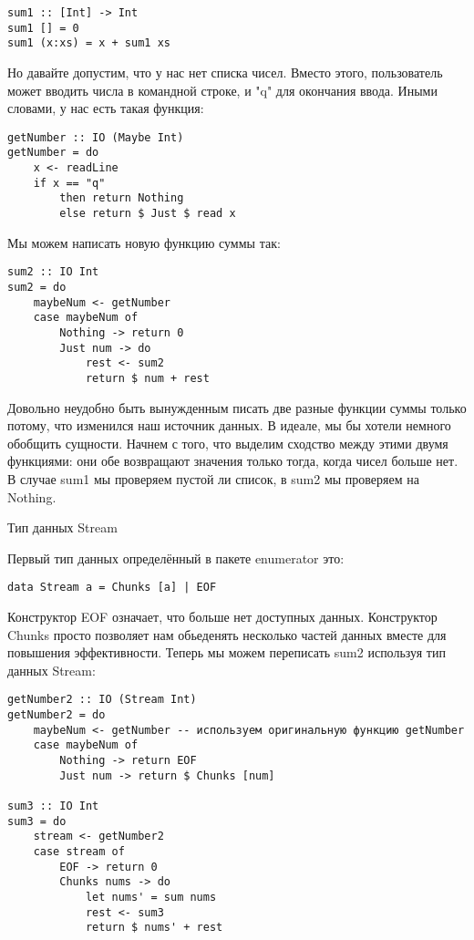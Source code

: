 \begin{lstlisting}
sum1 :: [Int] -> Int
sum1 [] = 0
sum1 (x:xs) = x + sum1 xs
\end{lstlisting}

Но давайте допустим, что у нас нет списка чисел. Вместо этого, пользователь может вводить числа в командной строке, и "q" для окончания ввода. Иными словами, у нас есть такая функция:

\begin{lstlisting}
getNumber :: IO (Maybe Int)
getNumber = do
    x <- readLine
    if x == "q"
        then return Nothing
        else return $ Just $ read x
\end{lstlisting}

Мы можем написать новую функцию суммы так:

\begin{lstlisting}
sum2 :: IO Int
sum2 = do
    maybeNum <- getNumber
    case maybeNum of
        Nothing -> return 0
        Just num -> do
            rest <- sum2
            return $ num + rest
\end{lstlisting}

Довольно неудобно быть вынужденным писать две разные функции суммы только потому, что изменился наш источник данных. В идеале, мы бы хотели немного обобщить сущности. Начнем с того, что выделим сходство между этими двумя функциями: они обе возвращают значения только тогда, когда чисел больше нет. В случае sum1 мы проверяем пустой ли список, в sum2 мы проверяем на Nothing.

Тип данных Stream

Первый тип данных определённый в пакете enumerator это: 

\begin{lstlisting}
data Stream a = Chunks [a] | EOF
\end{lstlisting}

Конструктор EOF означает, что больше нет доступных данных. Конструктор Chunks просто позволяет нам обьеденять несколько частей данных вместе для повышения эффективности. Теперь мы можем переписать sum2 используя тип данных Stream:

\begin{lstlisting}
getNumber2 :: IO (Stream Int)
getNumber2 = do
    maybeNum <- getNumber -- используем оригинальную функцию getNumber
    case maybeNum of
        Nothing -> return EOF
        Just num -> return $ Chunks [num]

sum3 :: IO Int
sum3 = do
    stream <- getNumber2
    case stream of
        EOF -> return 0
        Chunks nums -> do
            let nums' = sum nums
            rest <- sum3
            return $ nums' + rest
\end{lstlisting}

